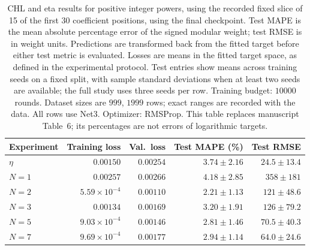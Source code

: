 \begin{table}[!htbp]
\centering
\small
\setlength{\tabcolsep}{4pt}
\renewcommand{\arraystretch}{1.18}
\begin{tabular}{@{}lrrrr@{}}
\toprule
Experiment & Training loss & Val.\ loss & Test MAPE (\%) & Test RMSE \\
\midrule
$\eta$ & $0.00150$ & $0.00254$ & $3.74\pm2.16$ & $24.5\pm13.4$ \\
$N=1$ & $0.00257$ & $0.00266$ & $4.18\pm2.85$ & $358\pm181$ \\
$N=2$ & $5.59\times10^{-4}$ & $0.00110$ & $2.21\pm1.13$ & $121\pm48.6$ \\
$N=3$ & $0.00134$ & $0.00169$ & $3.20\pm1.91$ & $126\pm79.2$ \\
$N=5$ & $9.03\times10^{-4}$ & $0.00146$ & $2.81\pm1.46$ & $70.5\pm40.3$ \\
$N=7$ & $9.69\times10^{-4}$ & $0.00177$ & $2.94\pm1.14$ & $64.0\pm24.6$ \\
\bottomrule
\end{tabular}
\caption{\textsf{CHL and eta results for positive integer powers, using the recorded fixed slice of 15 of the first 30 coefficient positions, using the final checkpoint. Test MAPE is the mean absolute percentage error of the signed modular weight; test RMSE is in weight units. Predictions are transformed back from the fitted target before either test metric is evaluated. Losses are means in the fitted target space, as defined in the experimental protocol. Test entries show means across training seeds on a fixed split, with sample standard deviations when at least two seeds are available; the full study uses three seeds per row. Training budget: $10000$ rounds. Dataset sizes are $999$, $1999$ rows; exact ranges are recorded with the data. All rows use Net3. Optimizer: RMSProp. This table replaces manuscript Table~6; its percentages are not errors of logarithmic targets.}}
\label{tab:chl-revised-6-final}
\end{table}
